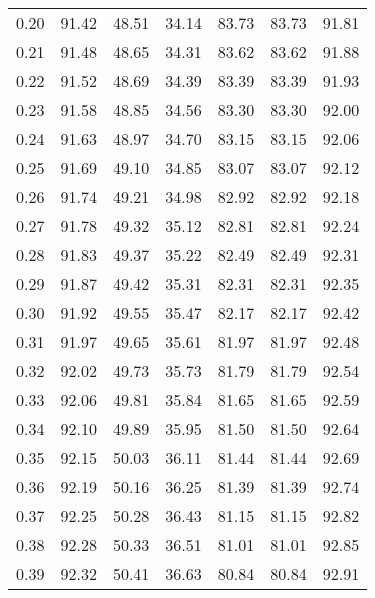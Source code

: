 \begin{tabular}{|c|c|c|c|c|c|c|}
      0.20 &     91.42 &     48.51 &      34.14 &   83.73 &      83.73 &         91.81 \\
      0.21 &     91.48 &     48.65 &      34.31 &   83.62 &      83.62 &         91.88 \\
      0.22 &     91.52 &     48.69 &      34.39 &   83.39 &      83.39 &         91.93 \\
      0.23 &     91.58 &     48.85 &      34.56 &   83.30 &      83.30 &         92.00 \\
      0.24 &     91.63 &     48.97 &      34.70 &   83.15 &      83.15 &         92.06 \\
      0.25 &     91.69 &     49.10 &      34.85 &   83.07 &      83.07 &         92.12 \\
      0.26 &     91.74 &     49.21 &      34.98 &   82.92 &      82.92 &         92.18 \\
      0.27 &     91.78 &     49.32 &      35.12 &   82.81 &      82.81 &         92.24 \\
      0.28 &     91.83 &     49.37 &      35.22 &   82.49 &      82.49 &         92.31 \\
      0.29 &     91.87 &     49.42 &      35.31 &   82.31 &      82.31 &         92.35 \\
      0.30 &     91.92 &     49.55 &      35.47 &   82.17 &      82.17 &         92.42 \\
      0.31 &     91.97 &     49.65 &      35.61 &   81.97 &      81.97 &         92.48 \\
      0.32 &     92.02 &     49.73 &      35.73 &   81.79 &      81.79 &         92.54 \\
      0.33 &     92.06 &     49.81 &      35.84 &   81.65 &      81.65 &         92.59 \\
      0.34 &     92.10 &     49.89 &      35.95 &   81.50 &      81.50 &         92.64 \\
      0.35 &     92.15 &     50.03 &      36.11 &   81.44 &      81.44 &         92.69 \\
      0.36 &     92.19 &     50.16 &      36.25 &   81.39 &      81.39 &         92.74 \\
      0.37 &     92.25 &     50.28 &      36.43 &   81.15 &      81.15 &         92.82 \\
      0.38 &     92.28 &     50.33 &      36.51 &   81.01 &      81.01 &         92.85 \\
      0.39 &     92.32 &     50.41 &      36.63 &   80.84 &      80.84 &         92.91 \\

\end{tabular}
